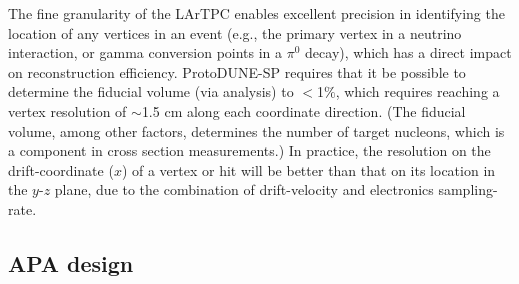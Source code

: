 
The fine granularity of the LArTPC enables excellent precision in identifying the location of any vertices in an event (e.g., the primary vertex in a neutrino interaction, or gamma conversion points in a $\pi^{0}$ decay), which has a direct impact on reconstruction efficiency. ProtoDUNE-SP requires that it be possible to determine the fiducial volume (via analysis) to $<$1$\%$, which requires reaching a vertex resolution of $\sim$1.5 cm along each coordinate direction. (The fiducial volume, among other factors, determines the number of target nucleons, which is a component in cross section measurements.) In practice, the resolution on the drift-coordinate ($x$) of a vertex or hit will be better than that on its location in the $y$-$z$ plane, due to the combination of drift-velocity and electronics sampling-rate.


\subsection{APA design}
\label{subsec:apa_phys_desc}

